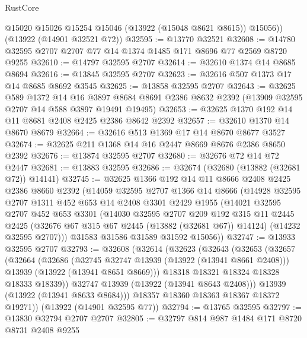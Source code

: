 \begin{lexlean}{RustCore}
\begin{coremodule}
        @15020
        @15026
        @15254
        @15046
        (@13922 (@15048 @8621 @8615))
        @15056))
    (@13922 (@14901 @32521 @72))
@32595 := @13770 @32521
@32608 := @14780 @32595 @2707 @2707 @77 @14 @1374 @1485 @171 @8696 @77 @2569 @8720 @9255
@32610 := @14797 @32595 @2707
@32614 := @32610 @1374 @14 @8685 @8694
@32616 := @13845 @32595 @2707
@32623 := @32616 @507 @1373 @17 @14 @8685 @8692 @3545
@32625 := @13858 @32595 @2707
@32643 := @32625
    @589
    @1372
    @14
    @16
    @3897
    @8684
    @8691
    @2386
    @8632
    @2392
    (@13909 @32595 @2707 @14 @588 @3897 @19491 @19495)
@32653 := @32625 @1370 @192 @14 @11 @8681 @2408 @2425 @2386 @8642 @2392
@32657 := @32610 @1370 @14 @8670 @8679
@32664 := @32616 @513 @1369 @17 @14 @8670 @8677 @3527
@32674 := @32625 @211 @1368 @14 @16 @2447 @8669 @8676 @2386 @8650 @2392
@32676 := @13874 @32595 @2707
@32680 := @32676 @72 @14 @72 @2447
@32681 := @13883 @32595
@32686 := @32674 (@32680 (@13882 (@32681 @72)) @14141)
@32745 := @32625
    @1366
    @192
    @14
    @11
    @8666
    @2408
    @2425
    @2386
    @8660
    @2392
    (@14059
      @32595
      @2707
      @1366
      @14
      @8666
      (@14928
        @32595
        @2707
        @1311
        @452
        @653
        @14
        @2408
        @3301
        @2429
        @1955
        (@14021
          @32595
          @2707
          @452
          @653
          @3301
          (@14030
            @32595
            @2707
            @209
            @192
            @315
            @11
            @2445
            @2425
            (@32676 @67 @315 @67 @2445 (@13882 (@32681 @67)) @14124)
            (@14232 @32595 @2707)))
        @31583
        @31586
        @31589
        @31592
        @15056))
@32747 := @13933 @32595 @2707
@32793 := @32608
    (@32614
      (@32623
        (@32643
          (@32653
            (@32657
              (@32664
                (@32686
                  (@32745 @32747 @13939 (@13922 (@13941 @8661 @2408)))
                  @13939
                  (@13922 (@13941 @8651 @8669)))
                @18318
                @18321
                @18324
                @18328
                @18333
                @18339))
            @32747
            @13939
            (@13922 (@13941 @8643 @2408)))
          @13939
          (@13922 (@13941 @8633 @8684)))
        @18357
        @18360
        @18363
        @18367
        @18372
        @19271))
    (@13922 (@14901 @32595 @77))
@32794 := @13765 @32595
@32797 := @13830 @32794 @2707 @2707
@32805 := @32797 @814 @987 @1484 @171 @8720 @8731 @2408 @9255

\end{coremodule}
\end{lexlean}

